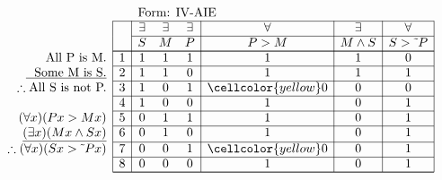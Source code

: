 \documentclass[10pt,legalpaper,landscape,cmtt]{article}
\begin{document}
{\begin{minipage}[t]{3.25in}
	\(
	\begin{array}{r|c|ccc|c|c|c|}
		\multicolumn{2}{c}{}&\multicolumn{6}{l}{\mbox{Form: IV-AIE}} \\ \cline{2-8}
		\hspace{1in}	&	& \exists & \exists & \exists & \forall & \exists & \forall\\ \cline{3-8}
		&	& S & M & P &  P > M  &  M \wedge S  &  S > \tilde~P \\ \cline{2-8} \cline{2-8}
		\phantom{\therefore}\mbox{All P is M.}   & 1 & 1 & 1 & 1 &   1   &   1   &   0  \\ \cline{2-8}
		\underline{\phantom{\therefore}\mbox{Some M is S.}}   & 2 & 1 & 1 & 0 &   1   &   1   &   1  \\ \cline{2-8}
		\therefore \mbox{All S is not P.}   & 3 & 1 & 0 & 1 &   \cellcolor{yellow} 0   &   0   &   0  \\ \cline{2-8}
		& 4 & 1 & 0 & 0 &   1   &   0   &   1  \\ \cline{2-8}
		(\forall x)(Px > Mx)   & 5 & 0 & 1 & 1 &   1   &   0   &   1  \\ \cline{2-8}
		\underline{(\exists x)(Mx \wedge Sx)}   & 6 & 0 & 1 & 0 &   1   &   0   &   1  \\ \cline{2-8}
		\therefore(\forall x)(Sx > \tilde~Px)   & 7 & 0 & 0 & 1 &   \cellcolor{yellow} 0   &   0   &   1  \\ \cline{2-8}
		& 8 & 0 & 0 & 0 &   1   &   0   &   1   \\ \cline{2-8}\cline{2-8} 
	\end{array}
	\)
\end{minipage}

}
\end{document}
